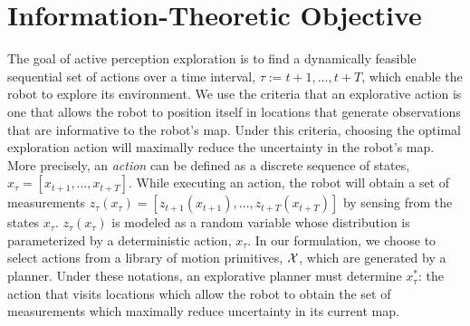 \section{Information-Theoretic Objective}
\label{sec:information_theoretic_objective}

The goal of active perception exploration is to find a dynamically feasible
sequential set of actions over a time interval, $\tau := t+1,\dots,t+T$, which
enable the robot to explore its environment. We use the criteria that an
explorative action is one that allows the robot to position itself in locations
that generate observations that are informative to the robot's map. Under this
criteria, choosing the optimal exploration action will maximally reduce the
uncertainty in the robot's map. More precisely, an \textit{action} can be defined as a discrete sequence of
states, $x_{\tau} = \left[x_{t+1},\dots,x_{t+T}\right]$. While executing an action,
the robot will obtain a set of measurements $z_{\tau}(x_{\tau}) =
\left[z_{t+1}(x_{t+1}),\dots,z_{t+T}(x_{t+T})\right]$ by sensing from the states
$x_{\tau}$. $z_{\tau}(x_{\tau})$ is modeled as a random variable whose distribution
is parameterized by a deterministic action, $x_{\tau}$. In our formulation, we
choose to select actions from a library of motion primitives, $\mathcal{X}$, which
are generated by a planner. Under these notations, an explorative planner must
determine $x_{\tau}^{*}$: the action that visits locations which allow the robot
to obtain the set of measurements which maximally reduce uncertainty in its
current map.

